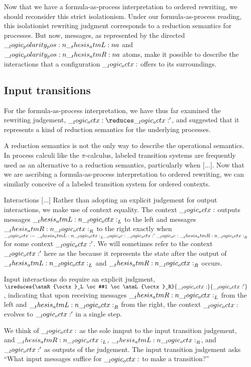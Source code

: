 Now that we have a formula-as-process interpretation to ordered rewriting, we should reconsider this strict isolationism.
Under our formula-as-process reading, this isolationist rewriting judgment corresponds to a reduction semantics for processes.
But now, messages, as represented by the directed $\__logic_polarity_pos:n {\__thesis_atmL:n {a}}$ and $\__logic_polarity_pos:n {\__thesis_atmR:n {a}}$ atoms, make it possible to describe the interactions that a configuration $\__logic_octx:$ offers to its surroundings. 

\subsection{Input transitions}


For the formula-as-process interpretation, we have thus far examined the rewriting judgement, $\octx \reduces \octx'$, and suggested that it represents a kind of reduction semantics for the underlying processes.

A reduction semantics is not the only way to describe the operational semantics.
In process calculi like the $\pi$-calculus, labeled transition systems are frequently used as an alternative to a reduction semantics, particularly when [...].
Now that we are ascribing a formula-as-process interpretation to ordered rewriting, we can similarly conceive of a labeled transition system for ordered contexts.

Interactions [...]
Rather than adopting an explicit judgement for output interactions, we make use of context equality. 
The context $\__logic_octx:$ outputs messages $\__thesis_atmL:n {\__logic_octx:}_L$ to the left and messages $\__thesis_atmR:n {\__logic_octx:}_R$ to the right exactly when $\__logic_octx: = \__thesis_atmL:n {\__logic_octx:}_L \__logic_oc: \__logic_octx:' \__logic_oc: \__thesis_atmR:n {\__logic_octx:}_R$ for some context $\__logic_octx:'$.
We will sometimes refer to the context $\__logic_octx:'$ here as the  because it represents the state after the output of $\__thesis_atmL:n {\__logic_octx:}_L$ and $\__thesis_atmR:n {\__logic_octx:}_R$ occurs.

Input interactions do require an explicit judgment, $\ireduces{\atmR{\octx}_L \oc #1 \oc \atmL{\octx}_R}{\octx}{\octx'}$, indicating that upon receiving messages $\__thesis_atmR:n {\__logic_octx:}_L$ from the left and $\__thesis_atmL:n {\__logic_octx:}_R$ from the right, the context $\__logic_octx:$ evolves to $\__logic_octx:'$ in a single step.

We think of $\__logic_octx:$ as the sole innput to the input transition judgement, and $\__thesis_atmR:n {\__logic_octx:}_L$, $\__thesis_atmL:n {\__logic_octx:}_R$, and $\__logic_octx:'$ as outputs of the judgement.
The input transition judgement asks \enquote{What input messages suffice for $\__logic_octx:$ to make a transition?}

